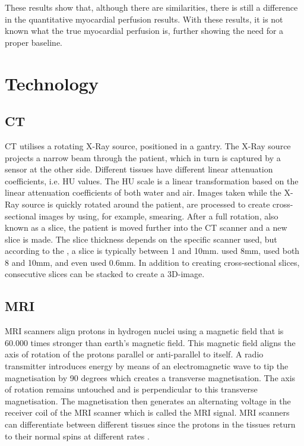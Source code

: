 These results show that, although there are similarities, there is still a difference in the quantitative myocardial perfusion results. With these results, it is not known what the true myocardial perfusion is, further showing the need for a proper baseline.

\section{Technology}
\subsection{CT}
\ac{CT} utilises a rotating X-Ray source, positioned in a gantry. The X-Ray source projects a narrow beam through the patient, which in turn is captured by a sensor at the other side. Different tissues have different linear attenuation coefficients, i.e. \ac{HU} values. The \ac{HU} scale is a linear transformation based on the linear attenuation coefficients of both water and air. Images taken while the X-Ray source is quickly rotated around the patient, are processed to create cross-sectional images by using, for example, smearing. After a full rotation, also known as a slice, the patient is moved further into the \ac{CT} scanner and a new slice is made. The slice thickness depends on the specific scanner used, but according to the \cite{CTscan2016}, a slice is typically between 1 and 10mm. \cite{suzuki2017quantitative} used 8mm, \cite{mathys2012phantom} used both 8 and 10mm, and \cite{otton2013direct} even used 0.6mm. In addition to creating cross-sectional slices, consecutive slices can be stacked to create a 3D-image. 

\subsection{MRI}
\ac{MRI} scanners align protons in hydrogen nuclei using a magnetic field that is 60.000 times stronger than earth's magnetic field. This magnetic field aligns the axis of rotation of the protons parallel or anti-parallel to itself. A radio transmitter introduces energy by means of an electromagnetic wave to tip the magnetisation by 90 degrees which creates a transverse magnetisation. The axis of rotation remains untouched and is perpendicular to this transverse magnetisation. The magnetisation then generates an alternating voltage in the receiver coil of the \ac{MRI} scanner which is called the \acs{MRI} signal\citep{weishaupt2008does}. \ac{MRI} scanners can differentiate between different tissues since the protons in the tissues return to their normal spins at different rates \citep{MRIscan2017}.


